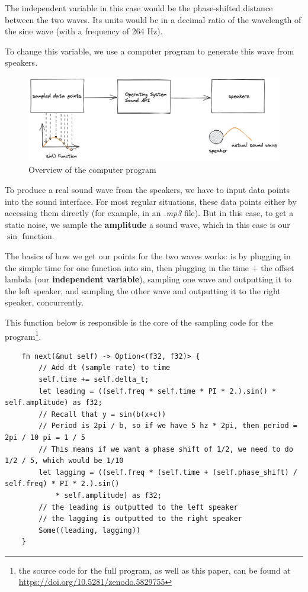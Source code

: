 \documentclass[index]{subfiles}
\begin{document}
The independent variable in this case would be the phase-shifted distance between the two waves. Its units would be in a decimal ratio of the wavelength of the sine wave (with a frequency of 264 Hz).

To change this variable, we use a computer program to generate this wave from speakers.

\begin{figure}[H]
    \centering
    \includegraphics[scale=0.2]{layout.png}
    \caption{Overview of the computer program}
\end{figure}

To produce a real sound wave from the speakers, we have to input data points into the sound interface. For most regular situations, these data points either by accessing them directly (for example, in an \textit{.mp3} file). But in this case, to get a static noise, we sample the \textbf{amplitude} a sound wave, which in this case is our \(\sin\) function.

The basics of how we get our points for the two waves works: is by plugging in the simple time for one function into sin, then plugging in the time + the offset lambda (our \textbf{independent variable}), sampling one wave and outputting it to the left speaker, and sampling the other wave and outputting it to the right speaker, concurrently.

This function below is responsible is the core of the sampling code for the program\footnote[1]{the source code for the full program, as well as this paper, can be found at \href{https://doi.org/10.5281/zenodo.5829755}{https://doi.org/10.5281/zenodo.5829755}}.

\begin{verbatim}
    fn next(&mut self) -> Option<(f32, f32)> {
        // Add dt (sample rate) to time
        self.time += self.delta_t;
        let leading = ((self.freq * self.time * PI * 2.).sin() * self.amplitude) as f32;
        // Recall that y = sin(b(x+c))
        // Period is 2pi / b, so if we have 5 hz * 2pi, then period = 2pi / 10 pi = 1 / 5
        // This means if we want a phase shift of 1/2, we need to do 1/2 / 5, which would be 1/10
        let lagging = ((self.freq * (self.time + (self.phase_shift) / self.freq) * PI * 2.).sin()
            * self.amplitude) as f32;
        // the leading is outputted to the left speaker
        // the lagging is outputted to the right speaker
        Some((leading, lagging))
    }
\end{verbatim}
\end{document}

